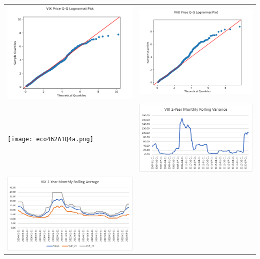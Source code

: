 \documentclass[12pt, a4paper]{article}
\theoremstyle{definition}
\begin{document}
\begin{table}[H]
	\centering
	\begin{tabu}to \textwidth {X[c]X[c]}

\includegraphics[width=75mm]{VIX Price Q-Q Plot Log.png} &\includegraphics[width=75mm]{VXO Price Q-Q Plot Log.png} \\ \texttt{[image: eco462A1Q4a.png]} & \includegraphics[width=75mm]{eco462A1Q4b.png}\\
\includegraphics[width=75mm]{eco462A1Q4c.png}
	\end{tabu}
\end{table} 
\end{document}
